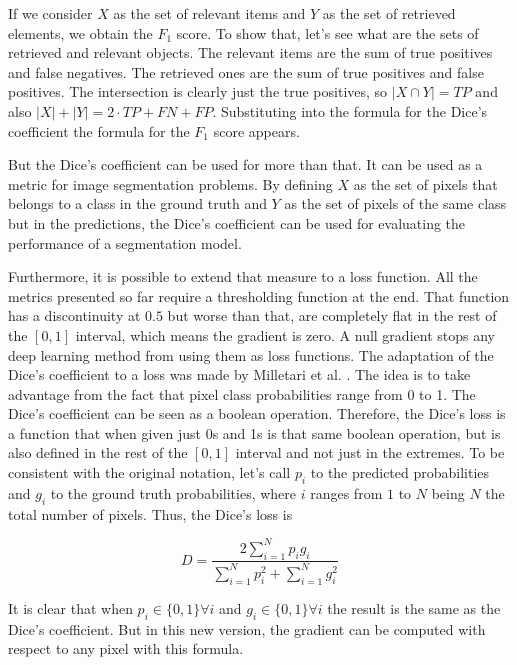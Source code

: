 If we consider $X$ as the set of relevant items and $Y$ as the set of retrieved elements, we obtain the $F_1$ score. To show that, let's see what are the sets of retrieved and relevant objects. The relevant items are the sum of true positives and false negatives. The retrieved ones are the sum of true positives and false positives. The intersection is clearly just the true positives, so $|X\cap Y| = TP$ and also $|X|+|Y|=2\cdot TP + FN + FP$. Substituting into the formula for the Dice's coefficient the formula for the $F_1$ score appears.

But the Dice's coefficient can be used for more than that. It can be used as a metric for image segmentation problems. By defining $X$ as the set of pixels that belongs to a class in the ground truth and $Y$ as the set of pixels of the same class but in the predictions, the Dice's coefficient can be used for evaluating the performance of a segmentation model. 

Furthermore, it is possible to extend that measure to a loss function. All the metrics presented so far require a thresholding function at the end. That function has a discontinuity at $0.5$ but worse than that, are completely flat in the rest of the $[0,1]$ interval, which means the gradient is zero. A null gradient stops any deep learning method from using them as loss functions. The adaptation of the Dice's coefficient to a loss was made by Milletari et al. \cite{milletari2016vnet}. The idea is to take advantage from the fact that pixel class probabilities range from 0 to 1. The Dice's coefficient can be seen as a boolean operation. Therefore, the Dice's loss is a function that when given just 0s and 1s is that same boolean operation, but is also defined in the rest of the $[0,1]$ interval and not just in the extremes. To be consistent with the original notation, let's call $p_i$ to the predicted probabilities and $g_i$ to the ground truth probabilities, where $i$ ranges from $1$ to $N$ being $N$ the total number of pixels. Thus, the Dice's loss is

\begin{equation}
    D = \frac{2 \sum_{i=1}^N p_i g_i}{\sum_{i=1}^N p_i^2 + \sum_{i=1}^N g_i^2}
\end{equation}

It is clear that when $p_i \in \{0,1\} \forall i$ and $g_i \in \{0,1\} \forall i$ the result is the same as the Dice's coefficient. But in this new version, the gradient can be computed with respect to any pixel with this formula.

